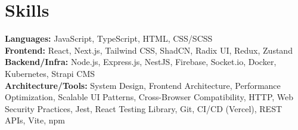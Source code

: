 \documentclass[9pt,letterpaper]{article}
\begin{document}
\section*{Skills}
\textbf{Languages:} JavaScript, TypeScript, HTML, CSS/SCSS \\
\textbf{Frontend:} React, Next.js, Tailwind CSS, ShadCN, Radix UI, Redux, Zustand \\
\textbf{Backend/Infra:} Node.js, Express.js, NestJS, Firebase, Socket.io, Docker, Kubernetes, Strapi CMS \\
\textbf{Architecture/Tools:} System Design, Frontend Architecture, Performance Optimization, Scalable UI Patterns, Cross-Browser Compatibility, HTTP, Web Security Practices, Jest, React Testing Library, Git, CI/CD (Vercel), REST APIs, Vite, npm
\end{document}
